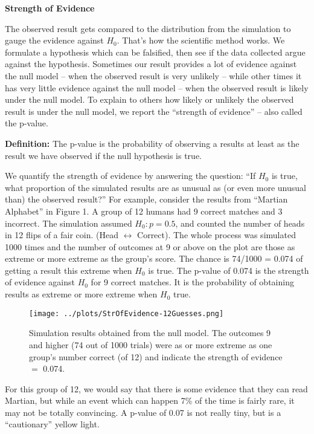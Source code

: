 \begin{center}
        {\large\bf Strength of Evidence}
 \end{center}
      The observed result gets compared to the distribution from the
      simulation to gauge the evidence against $H_0$.  That's
      how the scientific method works.  We formulate a hypothesis
      which can be falsified, then see if the data collected argue
      against the hypothesis. Sometimes our result provides a lot of
      evidence against the null model  -- when the observed result is very
      unlikely -- while other times it has very little evidence against
      the null model -- when the observed result is likely under the null
      model. To explain to others  how likely or unlikely the
      observed result is under the null model, we  report the
      ``strength of evidence'' -- also called  the p-value.

       {\bf Definition:} The p-value is the probability of observing a
       results at least as the result we have observed if the null
       hypothesis is true. 
 
       We quantify the strength of evidence by answering the question:
       ``If $H_0$ is true, what proportion of the simulated results
       are as unusual as (or even more unusual than) the observed
       result?''  For example, consider the results from ``Martian
       Alphabet'' in Figure 1. A group of 12 humans had 9 correct
       matches and 3 incorrect. The simulation assumed $H_0: p = 0.5$,
       and counted the number of heads in 12 flips of a fair
       coin. (Head $\leftrightarrow$ Correct).  The whole process was
       simulated 1000 times and the number of outcomes at 9 or above
       on the plot are those as extreme or more extreme as the group's
       score. The chance is 74/1000 = 0.074 of getting a result this
       extreme when $H_0$ is true.  The p-value of 0.074 is the
       strength of evidence against $H_0$ for 9 correct matches. It is
       the probability of obtaining results as extreme or more extreme
       when $H_0$ true. 

 \begin{figure}[h]
   \centering
  \texttt{[image: ../plots/StrOfEvidence-12Guesses.png]}

   \caption{ Simulation results obtained from the null model. The
      outcomes 9 and higher (74 out of 1000 trials) were as or more extreme
      as one group's number correct (of 12) and indicate the strength of
      evidence $=$ 0.074. }
   \label{fig:SOE-12}
 \end{figure}
  For this group of 12, we would say that there is some evidence that
  they can read Martian, but while an  event which can happen  7\% of
  the time is   fairly rare, it may not be totally convincing.  
  A p-value  of 0.07 is not really tiny, but is  a ``cautionary'' yellow
  light. 

